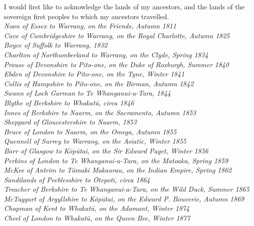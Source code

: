 \documentclass[
  a4paper,
]{scrbook}
\begin{document}
I would first like to acknowledge the lands of my ancestors, and the lands of the sovereign first peoples to which my ancestors travelled.\\[5pt]
\textit{Noon of Essex to Warrang, on the Friends, Autumn 1811} \\[5pt]
\textit{Cave of Cambridgeshire to Warrang, on the Royal Charlotte, Autumn 1825} \\[5pt]
\textit{Boyce of Suffolk to Warrang, 1832} \\[5pt] 
\textit{Charlton of Northumberland to Warrang, on the Clyde, Spring 1834} \\[5pt]
\textit{Prouse of Devonshire to Pito-one, on the Duke of Roxburgh, Summer 1840} \\[5pt]
\textit{Ebden of Devonshire to Pito-one, on the Tyne, Winter 1841} \\[5pt]
\textit{Collis of Hampshire to Pito-one, on the Birman, Autumn 1842} \\[5pt]
\textit{Swann of Loch Garman to Te Whanganui-a-Tara, 1844} \\[5pt] 
\textit{Blythe of Berkshire to Whakatū, circa 1846} \\[5pt]
\textit{Innes of Berkshire to Naarm, on the Sacramento, Autumn 1853} \\[5pt]
\textit{Sheppard of Gloucestershire to Naarm, 1853} \\[5pt] 
\textit{Bruce of London to Naarm, on the Omega, Autumn 1855} \\[5pt]
\textit{Quennell of Surrey to Warrang, on the Asiatic, Winter 1855} \\[5pt]
\textit{Barr of Glasgow to Kōpūtai, on the Sir Edward Paget, Winter 1856} \\[5pt] 
\textit{Perkins of London to Te Whanganui-a-Tara, on the Matoaka, Spring 1859} \\[5pt]
\textit{McKee of Antrim to Tāmaki Makaurau, on the Indian Empire, Spring 1862} \\[5pt]
\textit{Sandilands of Peeblesshire to Ōtepoti, circa 1864} \\[5pt] 
\textit{Treacher of Berkshire to Te Whanganui-a-Tara, on the Wild Duck, Summer 1865} \\[5pt]
\textit{McTaggart of Argyllshire to Kōpūtai, on the Edward P. Bouverie, Autumn 1869} \\[5pt] 
\textit{Chapman of Kent to Whakatū, on the Adamant, Winter 1874} \\[5pt]
\textit{Cheel of London to Whakatū, on the Queen Bee, Winter 1877} \\[5pt]  
\end{document}
